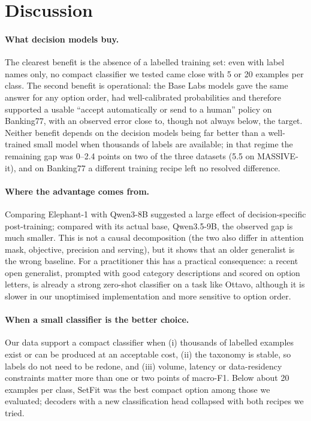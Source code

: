 \section{Discussion}
\label{sec:discussion}

\paragraph{What decision models buy.} The clearest benefit is the absence of a labelled training set: even with label names only,
no compact classifier we tested came close with 5 or 20 examples per class. The second benefit is operational: the Base Labs models gave the same answer
for any option order, had well-calibrated probabilities and therefore supported a usable ``accept automatically or send to a human''
policy on Banking77, with an observed error close to, though not always below, the target. Neither benefit depends on the decision models being far better than a well-trained small model when thousands of
labels are available; in that regime the remaining gap was 0--2.4 points on two of the three datasets (5.5 on MASSIVE-it),
and on Banking77 a different training recipe left no resolved difference.

\paragraph{Where the advantage comes from.} Comparing Elephant-1 with Qwen3-8B suggested a large effect of decision-specific
post-training; compared with its actual base, Qwen3.5-9B, the observed gap is much smaller. This is not a causal decomposition (the two
also differ in attention mask, objective, precision and serving), but it shows that an older generalist is the wrong baseline.
For a practitioner this has a practical consequence: a recent open generalist, prompted with good category descriptions and scored
on option letters, is already a strong zero-shot classifier on a task like Ottavo, although it is slower in our unoptimised
implementation and more sensitive to option order.

\paragraph{When a small classifier is the better choice.} Our data support a compact classifier when (i) thousands of labelled
examples exist or can be produced at an acceptable cost, (ii) the taxonomy is stable, so labels do not need to be redone, and (iii)
volume, latency or data-residency constraints matter more than one or two points of macro-F1. Below about 20 examples per class,
SetFit was the best compact option among those we evaluated; decoders with a new classification head collapsed with both recipes we tried.


